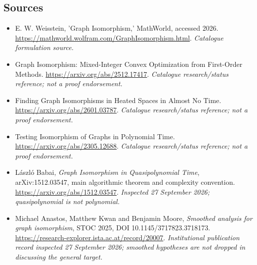 \documentclass[11pt,a4paper]{article}
\numberwithin{equation}{section}
\begin{document}
\subsection{Sources}
\begin{itemize}\raggedright
\item[\textnormal{[S1]}]\hypertarget{source:79:1}{} E. W. Weisstein, 'Graph Isomorphism,' MathWorld, accessed 2026.
\url{https://mathworld.wolfram.com/GraphIsomorphism.html}.
{\small\textit{Catalogue formulation source.}}
\item[\textnormal{[S2]}]\hypertarget{source:79:2}{} Graph Isomorphism: Mixed-Integer Convex Optimization from First-Order Methods.
\url{https://arxiv.org/abs/2512.17417}.
{\small\textit{Catalogue research/status reference; not a proof endorsement.}}
\item[\textnormal{[S3]}]\hypertarget{source:79:3}{} Finding Graph Isomorphisms in Heated Spaces in Almost No Time.
\url{https://arxiv.org/abs/2601.03787}.
{\small\textit{Catalogue research/status reference; not a proof endorsement.}}
\item[\textnormal{[S4]}]\hypertarget{source:79:4}{} Testing Isomorphism of Graphs in Polynomial Time.
\url{https://arxiv.org/abs/2305.12688}.
{\small\textit{Catalogue research/status reference; not a proof endorsement.}}
\item[\textnormal{[E1]}]\hypertarget{extra:79:1}{} L\'aszl\'o Babai,
\emph{Graph Isomorphism in Quasipolynomial Time}, arXiv:1512.03547,
main algorithmic theorem and complexity convention.
\url{https://arxiv.org/abs/1512.03547}.
{\small\textit{Inspected 27 September 2026; quasipolynomial is not polynomial.}}
\item[\textnormal{[E2]}]\hypertarget{extra:79:2}{} Michael Anastos,
Matthew Kwan and Benjamin Moore, \emph{Smoothed analysis for graph isomorphism},
STOC 2025, DOI 10.1145/3717823.3718173.
\url{https://research-explorer.ista.ac.at/record/20007}.
{\small\textit{Institutional publication record inspected 27 September
2026; smoothed hypotheses are not dropped in discussing the general target.}}
\end{itemize}
\end{document}

